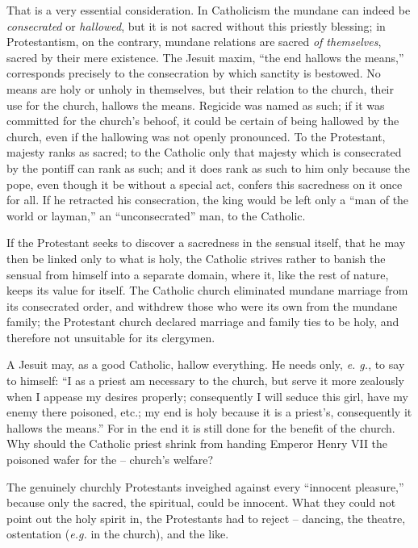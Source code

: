 That is a very essential consideration. In Catholicism the mundane can indeed 
be \textit{consecrated} or \textit{hallowed}, but it is not sacred without 
this priestly blessing; in Protestantism, on the contrary, mundane relations 
are sacred \textit{of themselves}, sacred by their mere existence. The Jesuit 
maxim, ``the end hallows the means,'' corresponds precisely to the 
consecration by which sanctity is bestowed. No means are holy or unholy in 
themselves, but their relation to the church, their use for the church, 
hallows the means. Regicide was named as such; if it was committed for the 
church's behoof, it could be certain of being hallowed by the church, even if 
the hallowing was not openly pronounced. To the Protestant, majesty ranks as 
sacred; to the Catholic only that majesty which is consecrated by the pontiff 
can rank as such; and it does rank as such to him only because the pope, even 
though it be without a special act, confers this sacredness on it once for 
all. If he retracted his consecration, the king would be left only a ``man of 
the world or layman,'' an ``unconsecrated'' man, to the Catholic.

If the Protestant seeks to discover a sacredness in the sensual itself, that 
he may then be linked only to what is holy, the Catholic strives rather to 
banish the sensual from himself into a separate domain, where it, like the 
rest of nature, keeps its value for itself. The Catholic church eliminated 
mundane marriage from its consecrated order, and withdrew those who were its 
own from the mundane family; the Protestant church declared marriage and 
family ties to be holy, and therefore not unsuitable for its clergymen.

A Jesuit may, as a good Catholic, hallow everything. He needs only, \textit{e. 
g.}, to say to himself: ``I as a priest am necessary to the church, but serve 
it more zealously when I appease my desires properly; consequently I will 
seduce this girl, have my enemy there poisoned, etc.; my end is holy because 
it is a priest's, consequently it hallows the means.'' For in the end it is 
still done for the benefit of the church. Why should the Catholic priest 
shrink from handing Emperor Henry VII the poisoned wafer for the -- church's 
welfare?

The genuinely churchly Protestants inveighed against every ``innocent 
pleasure,'' because only the sacred, the spiritual, could be innocent. What 
they could not point out the holy spirit in, the Protestants had to reject -- 
dancing, the theatre, ostentation (\textit{e.g.} in the church), and the 
like.

